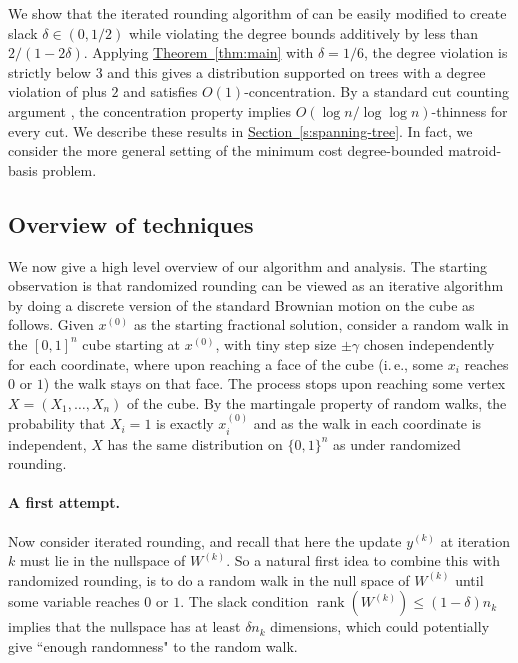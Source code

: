 \documentclass[11pt]{article}
\newcommand{\rank}{\operatorname{rank}}
\theoremstyle{definition}
\newcommand{\expref}[2]{\texorpdfstring{\hyperref[#2]{#1~\ref{#2}}}{#1~\ref{#2}}}
\newcommand{\ie}{i.\,e.}
\begin{document}
%
%
%

 We show that the iterated rounding algorithm of \cite{SL07} can be easily modified to create slack $\delta \in (0,1/2)$ while violating the degree bounds additively by less than $2/(1-2\delta)$. Applying \expref{Theorem}{thm:main} with $\delta = 1/6$, the degree violation is strictly below $3$ and this gives a distribution supported on trees with a degree violation of plus $2$ and satisfies $O(1)$-concentration. By a standard cut counting argument \cite{AGMOS10}, the concentration property implies $O(\log n/\log \log n)$-thinness for every cut.
We describe these results in \expref{Section}{s:spanning-tree}. In fact, we consider the more general
setting of the minimum cost degree-bounded matroid-basis problem.

%
%
%
%
%
%
%
%

%

%
%
%

%
%

%
%


\subsection{Overview of techniques}
We now give a high level overview of our algorithm and  analysis.
The starting observation is that randomized rounding can be viewed as an iterative algorithm by doing a discrete version of the standard Brownian motion on the cube as follows.
Given $x^{(0)}$ as the starting fractional solution, consider a random walk in the $[0,1]^n$ cube starting at $x^{(0)}$, with tiny step size $\pm \gamma$ chosen independently for each coordinate, where upon reaching a face of the cube (\ie, some $x_i$ reaches $0$ or $1$) the walk stays on that face.
The process stops upon reaching some vertex $X=(X_1,\ldots,X_n)$ of the cube. By the martingale property of random walks, the probability
that $X_i=1$ is exactly $x_i^{(0)}$ and as the  walk in each coordinate is independent, $X$ has the same distribution on $\{0,1\}^n$ as under randomized rounding.

\paragraph{A first attempt.} Now consider iterated rounding, and recall that here the update $y^{(k)}$ at iteration $k$ must lie in the nullspace of $W^{(k)}$. So a natural first idea to combine this with randomized rounding, is to do a random walk in the null space of $W^{(k)}$ until some variable reaches $0$ or $1$. The slack condition $\rank(W^{(k)}) \leq (1-\delta) n_k$ implies that the nullspace has at least $\delta n_k$ dimensions, which could potentially give ``enough randomness" to the random walk.
\end{document}
